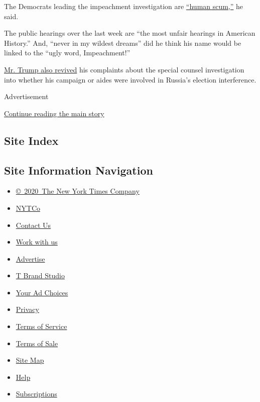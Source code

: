The Democrats leading the impeachment investigation are
\href{https://twitter.com/realDonaldTrump/status/1197503790729121794}{``human
scum,''} he said.

The public hearings over the last week are ``the most unfair hearings in
American History.'' And, ``never in my wildest dreams'' did he think his
name would be linked to the ``ugly word, Impeachment!''

\href{https://twitter.com/realDonaldTrump/status/1197499642243670018}{Mr.
Trump also revived} his complaints about the special counsel
investigation into whether his campaign or aides were involved in
Russia's election interference.

Advertisement

\protect\hyperlink{after-bottom}{Continue reading the main story}

\hypertarget{site-index}{%
\subsection{Site Index}\label{site-index}}

\hypertarget{site-information-navigation}{%
\subsection{Site Information
Navigation}\label{site-information-navigation}}

\begin{itemize}
\tightlist
\item
  \href{https://help.nytimes3xbfgragh.onion/hc/en-us/articles/115014792127-Copyright-notice}{©~2020~The
  New York Times Company}
\end{itemize}

\begin{itemize}
\tightlist
\item
  \href{https://www.nytco.com/}{NYTCo}
\item
  \href{https://help.nytimes3xbfgragh.onion/hc/en-us/articles/115015385887-Contact-Us}{Contact
  Us}
\item
  \href{https://www.nytco.com/careers/}{Work with us}
\item
  \href{https://nytmediakit.com/}{Advertise}
\item
  \href{http://www.tbrandstudio.com/}{T Brand Studio}
\item
  \href{https://www.nytimes3xbfgragh.onion/privacy/cookie-policy\#how-do-i-manage-trackers}{Your
  Ad Choices}
\item
  \href{https://www.nytimes3xbfgragh.onion/privacy}{Privacy}
\item
  \href{https://help.nytimes3xbfgragh.onion/hc/en-us/articles/115014893428-Terms-of-service}{Terms
  of Service}
\item
  \href{https://help.nytimes3xbfgragh.onion/hc/en-us/articles/115014893968-Terms-of-sale}{Terms
  of Sale}
\item
  \href{https://spiderbites.nytimes3xbfgragh.onion}{Site Map}
\item
  \href{https://help.nytimes3xbfgragh.onion/hc/en-us}{Help}
\item
  \href{https://www.nytimes3xbfgragh.onion/subscription?campaignId=37WXW}{Subscriptions}
\end{itemize}
